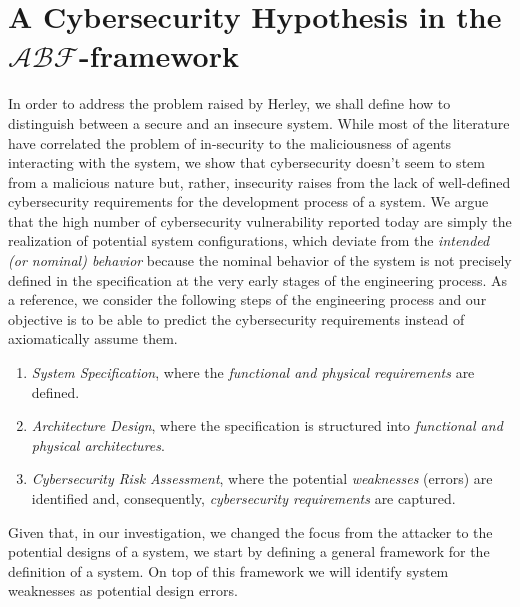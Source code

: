 \documentclass[conference]{IEEEtran}
\newcommand{\assertionRegion}{\mathcal{A}}
\newcommand{\beliefRegion}{\mathcal{B}}
\newcommand{\factRegion}{\mathcal{F}}
\newcommand{\abftheory}{\assertionRegion\beliefRegion\factRegion}
\begin{document}
\section{A Cybersecurity Hypothesis in the $\abftheory$-framework}\label{sec:hypothesis}
In order to address the problem raised by Herley, we shall define how to
distinguish between a secure and an insecure system. While most of the
literature have correlated the problem of in-security
to the maliciousness of agents interacting with the system, we show that
cybersecurity doesn't seem to stem from a malicious nature but, rather, insecurity
raises from the lack of well-defined cybersecurity requirements for the development
process of a system. We argue that the high number of cybersecurity vulnerability
reported today are simply the realization of potential system configurations,
which deviate from the  \emph{intended (or
nominal) behavior} because the nominal behavior of the system is not precisely defined in the specification
at the very early stages of the engineering process.
As a reference, we consider the following steps of the engineering process
and our objective is to be able to predict the cybersecurity requirements
instead of axiomatically assume them.
\begin{enumerate}
	\item \emph{System Specification}, where the \emph{functional and physical requirements} are defined.
	\item \emph{Architecture Design}, where the specification is structured into \emph{functional and physical architectures}.
	\item \emph{Cybersecurity Risk Assessment}, where the potential \emph{weaknesses} (errors)
		are identified and, consequently, \emph{cybersecurity requirements} are
		captured.
\end{enumerate}
Given that, in our investigation, we changed the focus from the attacker to the
potential designs of a system, we start by defining a general framework for the definition
of a system. On top of this framework we will identify system weaknesses as potential
design errors.
\end{document}
